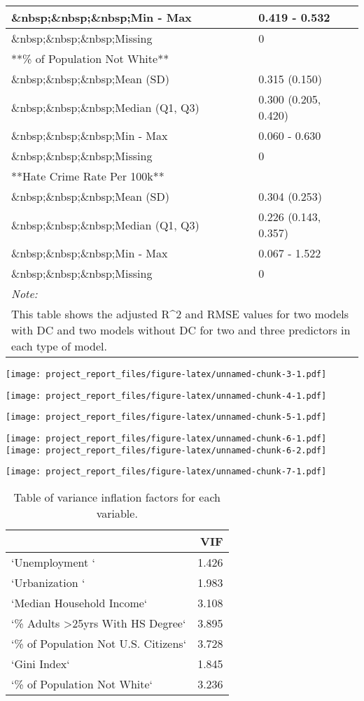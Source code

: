 \documentclass[
]{article}
\begin{document}
\begin{table}
\begin{tabular}[t]{l|l}
\hline
\&nbsp;\&nbsp;\&nbsp;Min - Max & 0.419 - 0.532\\
\hline
\&nbsp;\&nbsp;\&nbsp;Missing & 0\\
\hline
**\% of Population Not White** & \\
\hline
\&nbsp;\&nbsp;\&nbsp;Mean (SD) & 0.315 (0.150)\\
\hline
\&nbsp;\&nbsp;\&nbsp;Median (Q1, Q3) & 0.300 (0.205, 0.420)\\
\hline
\&nbsp;\&nbsp;\&nbsp;Min - Max & 0.060 - 0.630\\
\hline
\&nbsp;\&nbsp;\&nbsp;Missing & 0\\
\hline
**Hate Crime Rate Per 100k** & \\
\hline
\&nbsp;\&nbsp;\&nbsp;Mean (SD) & 0.304 (0.253)\\
\hline
\&nbsp;\&nbsp;\&nbsp;Median (Q1, Q3) & 0.226 (0.143, 0.357)\\
\hline
\&nbsp;\&nbsp;\&nbsp;Min - Max & 0.067 - 1.522\\
\hline
\&nbsp;\&nbsp;\&nbsp;Missing & 0\\
\hline
\multicolumn{2}{l}{\rule{0pt}{1em}\textit{Note: }}\\
\multicolumn{2}{l}{\rule{0pt}{1em}This table shows the adjusted R\textasciicircum{}2 and RMSE values for two models with DC and two models without DC for two and three predictors in each type of model.}\\
\end{tabular}
\end{table}

\texttt{[image: project\_report\_files/figure-latex/unnamed-chunk-3-1.pdf]}

\texttt{[image: project\_report\_files/figure-latex/unnamed-chunk-4-1.pdf]}

\texttt{[image: project\_report\_files/figure-latex/unnamed-chunk-5-1.pdf]}

\texttt{[image: project\_report\_files/figure-latex/unnamed-chunk-6-1.pdf]}
\texttt{[image: project\_report\_files/figure-latex/unnamed-chunk-6-2.pdf]}

\texttt{[image: project\_report\_files/figure-latex/unnamed-chunk-7-1.pdf]}

\begin{table}

\caption{\label{tab:unnamed-chunk-8}Table of variance inflation factors for each variable.}
\centering
\begin{tabular}[t]{l|r}
\hline
  & VIF\\
\hline
`Unemployment ` & 1.426\\
\hline
`Urbanization ` & 1.983\\
\hline
`Median Household Income` & 3.108\\
\hline
`\% Adults >25yrs With HS Degree` & 3.895\\
\hline
`\% of Population Not U.S. Citizens` & 3.728\\
\hline
`Gini Index` & 1.845\\
\hline
`\% of Population Not White` & 3.236\\
\hline
\end{tabular}
\end{table}
\end{document}
